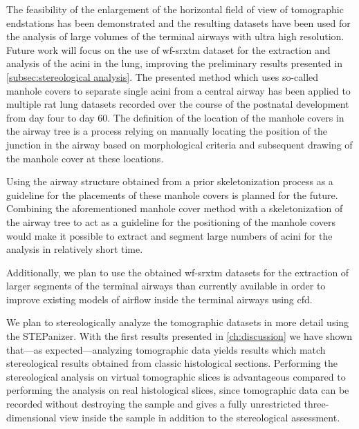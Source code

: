 The feasibility of the enlargement of the horizontal field of view of tomographic endstations has been demonstrated and the resulting datasets have been used for the analysis of large volumes of the terminal airways with ultra high resolution. Future work will focus on the use of \ac{wf-srxtm} dataset for the extraction and analysis of the acini in the lung, improving the preliminary results presented in \autoref{subsec:stereological analysis}. The presented method which uses so-called manhole covers to separate single acini from a central airway has been applied to multiple rat lung datasets recorded over the course of the postnatal development from day four to day 60. The definition of the location of the manhole covers in the airway tree is a process relying on manually locating the position of the junction in the airway based on morphological criteria and subsequent drawing of the manhole cover at these locations.

Using the airway structure obtained from a prior skeletonization process as a guideline for the placements of these manhole covers is planned for the future. Combining the aforementioned manhole cover method with a skeletonization of the airway tree to act as a guideline for the positioning of the manhole covers would make it possible to extract and segment large numbers of acini for the analysis in relatively short time.

Additionally, we plan to use the obtained \ac{wf-srxtm} datasets for the extraction of larger segments of the terminal airways than currently available in order to improve existing models of airflow inside the terminal airways using \ac{cfd}. 

We plan to stereologically analyze the tomographic datasets in more detail using the STEPanizer. With the first results presented in \autoref{ch:discussion} we have shown that---as expected---analyzing tomographic data yields results which match stereological results obtained from classic histological sections. Performing the stereological analysis on virtual tomographic slices is advantageous compared to performing the analysis on real histological slices, since tomographic data can be recorded without destroying the sample and gives a fully unrestricted three-dimensional view inside the sample in addition to the stereological assessment.

